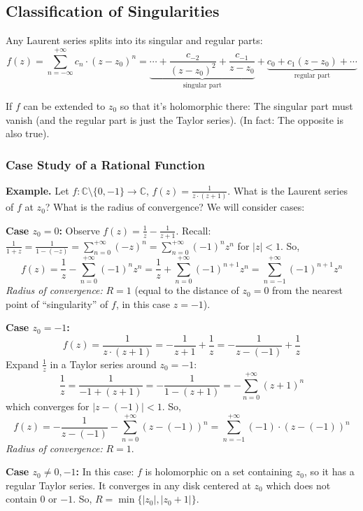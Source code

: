 \subsection{Classification of Singularities}

Any Laurent series splits into its singular and regular parts:
\[
    f(z) = \sum_{n=-\infty}^{+\infty} c_n \cdot (z-z_0)^n = \underbrace{\cdots + \frac{c_{-2}}{(z-z_0)^2} + \frac{c_{-1}}{z-z_0}}_{\text{singular part}} + \underbrace{c_0 + c_1(z-z_0) + \cdots}_{\text{regular part}}
\]

If $f$ can be extended to $z_0$ so that it's holomorphic there: The singular part must vanish (and the regular part is just the Taylor series). (In fact: The opposite is also true).

\subsubsection{Case Study of a Rational Function}

\noindent\textbf{Example.} Let $f: \mathbb{C} \setminus \{0, -1\} \longrightarrow \mathbb{C}$, $f(z) = \frac{1}{z \cdot (z+1)}$. What is the Laurent series of $f$ at $z_0$? What is the radius of convergence? We will consider cases:

\smallskip
\noindent\textbf{Case $z_0 = 0$:} Observe $f(z) = \frac{1}{z} - \frac{1}{z+1}$.
Recall: $\frac{1}{1+z} = \frac{1}{1-(-z)} = \sum_{n=0}^{+\infty} (-z)^n = \sum_{n=0}^{+\infty} (-1)^n z^n$ for $|z| < 1$. So,
\[
    f(z) = \frac{1}{z} - \sum_{n=0}^{+\infty} (-1)^n z^n = \frac{1}{z} + \sum_{n=0}^{+\infty} (-1)^{n+1} z^n = \sum_{n=-1}^{+\infty} (-1)^{n+1} z^n
\]
\textit{Radius of convergence:} $R = 1$ (equal to the distance of $z_0 = 0$ from the nearest point of ``singularity'' of $f$, in this case $z = -1$).

\smallskip
\noindent\textbf{Case $z_0 = -1$:}
\[
    f(z) = \frac{1}{z \cdot (z+1)} = -\frac{1}{z+1} + \frac{1}{z} = -\frac{1}{z-(-1)} + \frac{1}{z}
\]
Expand $\frac{1}{z}$ in a Taylor series around $z_0 = -1$:
\[
    \frac{1}{z} = \frac{1}{-1 + (z+1)} = -\frac{1}{1 - (z+1)} = -\sum_{n=0}^{+\infty} (z+1)^n
\]
which converges for $|z-(-1)| < 1$. So,
\[
    f(z) = -\frac{1}{z-(-1)} - \sum_{n=0}^{+\infty} (z-(-1))^n = \sum_{n=-1}^{+\infty} (-1) \cdot (z-(-1))^n
\]
\textit{Radius of convergence:} $R = 1$.

\smallskip
\noindent\textbf{Case $z_0 \ne 0, -1$:} In this case: $f$ is holomorphic on a set containing $z_0$, so it has a regular Taylor series. It converges in any disk centered at $z_0$ which does not contain $0$ or $-1$. So, $R = \min\{|z_0|, |z_0+1|\}$.

